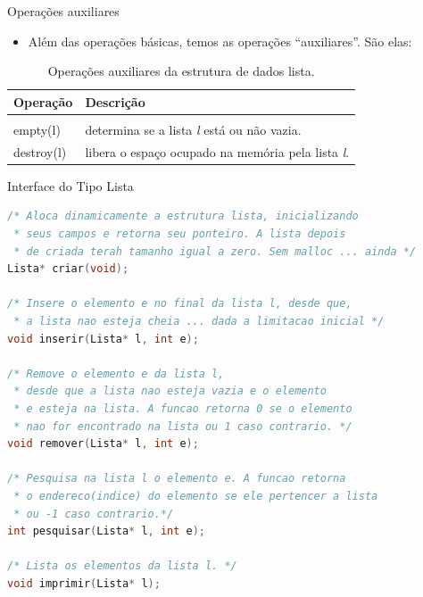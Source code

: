 \begin{frame}{Operações auxiliares}   
	\begin{itemize}
	\item Além das operações básicas, temos as operações ``auxiliares''. São elas:
	\end{itemize}
	\begin{table}[!htpb]
	  \centering
	\begin{tabular}{l||l}
	    \hline \hline 
	 \textbf{Operação} & \textbf{Descrição} \\
	\hline \hline \\
	    \hline empty(l) & determina se a lista \textit{l} está ou não vazia.\\
	    \hline destroy(l) & libera o espaço ocupado na memória pela lista \textit{l}.\\
	    \hline \hline
	\end{tabular}
\caption{Operações auxiliares da estrutura de dados lista.}
\end{table}
 \end{frame}
 

\begin{frame}{Interface do Tipo Lista}
\footnotesize
\begin{lstlisting}[language=C]
/* Aloca dinamicamente a estrutura lista, inicializando 
 * seus campos e retorna seu ponteiro. A lista depois 
 * de criada terah tamanho igual a zero. Sem malloc ... ainda */
Lista* criar(void);

/* Insere o elemento e no final da lista l, desde que,
 * a lista nao esteja cheia ... dada a limitacao inicial */
void inserir(Lista* l, int e);

/* Remove o elemento e da lista l,
 * desde que a lista nao esteja vazia e o elemento
 * e esteja na lista. A funcao retorna 0 se o elemento 
 * nao for encontrado na lista ou 1 caso contrario. */
void remover(Lista* l, int e);

/* Pesquisa na lista l o elemento e. A funcao retorna 
 * o endereco(indice) do elemento se ele pertencer a lista
 * ou -1 caso contrario.*/
int pesquisar(Lista* l, int e);

/* Lista os elementos da lista l. */
void imprimir(Lista* l);
\end{lstlisting}
\end{frame}

